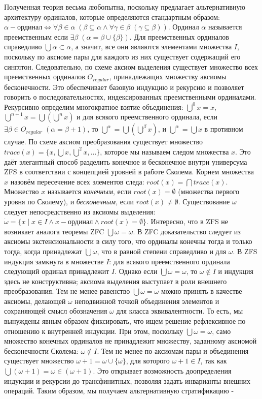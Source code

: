 \documentclass[12pt]{article}
\begin{document}
Полученная теория весьма любопытна, поскольку предлагает альтернативную архитектуру ординалов, которые определяются стандартным образом: $\alpha - \text{ординал} \Leftrightarrow \forall \beta \in \alpha \; (\beta \subseteq \alpha \wedge \forall \gamma \in \beta \; (\gamma \subseteq \beta))$. Ординал $\alpha$ называется преемственным если $\exists \beta \; (\alpha = \beta \cup \{ \beta \})$. Для преемственных ординалов справедливо $\bigcup \alpha \subset \alpha$, а значит, все они являются элементами множества $I$, поскольку по аксиоме пары для каждого из них существует содержащий его синглтон. Следовательно, по схеме аксиом выделения существует множество всех преемственных ординалов $O_{regular}$, принадлежащих множеству аксиомы бесконечности. Это обеспечивает базовую индукцию и рекурсию и позволяет говорить о последовательностях, индексированных преемственными ординалами. Рекурсивно определим многократное взятие объединения: $\bigcup^{0} x = x$, $\bigcup^{n + 1} x = \bigcup (\bigcup^{n} x)$ и для всякого преемственного ординала, если $\exists \beta \in O_{regular} \; (\alpha = \beta + 1)$, то $\bigcup^{\alpha} = \bigcup (\bigcup^{\beta} x)$, и $\bigcup^{\alpha} = \bigcup x$ в противном случае. По схеме аксиом преобразования существует множество $trace(x) = \{ x, \bigcup x, \bigcup^2 x, \dots \}$, которое мы называем следом множества $x$. Это даёт элегантный способ разделить конечное и бесконечное внутри универсума ZFS в соответствии с концепцией уровней в работе Сколема. Корнем множества $x$ назовём пересечение всех элементов следа: $root(x) = \bigcap trace(x)$. Множество $x$ называется {\it конечным}, если $root(x) = \emptyset$ (множества первого уровня по Сколему), и  {\it бесконечным}, если $root(x) \neq \emptyset$. Существование $\dot{\omega}$ следует непосредственно из аксиомы выделения: $\dot{\omega} = \{ x \mid x \in I \wedge x - \text{ординал} \wedge root(x) = \emptyset \}$. Интересно, что в ZFS не возникает аналога теоремы ZFC $\bigcup \omega = \omega$. В ZFC доказательство следует из аксиомы экстенсиональности в силу того, что ординалы конечны тогда и только тогда, когда принадлежат $\bigcup \omega$, что в равной степени справедливо и для $\omega$. В ZFS индукция замкнута в множестве $I$: для всякого преемственного ординала следующий ординал принадлежит $I$. Однако если $\bigcup \omega = \omega$, то $\omega \notin I$ и индукция здесь не конструктивна; аксиома выделения выступает в роли внешнего преобразования. Тем не менее равенство $\bigcup \omega = \omega$ можно принять в качестве аксиомы, делающей $\omega$ неподвижной точкой объединения элементов и сохраняющей смысл обозначения $\omega$ для класса эквивалентности. То есть, мы вынуждены явным образом фиксировать, что ищем решение рефлексивное по отношению к внутренней индукции. При этом, поскольку $\bigcup \omega = \omega$, само множество конечных ординалов не принадлежит множеству, заданному аксиомой бесконечности Сколема: $\omega \notin I$. Тем не менее по аксиомам пары и объединения существует множество $\omega + 1= \omega \cup \{\omega\}$, для которого $\omega + 1\in I$, так как $\bigcup (\omega + 1) = \omega \in (\omega + 1)$. Это открывает возможность доопределения индукции и рекурсии до трансфинитных, позволяя задать инварианты внешних операций. Таким образом, мы получаем альтернативную стратификацию - 
\end{document}
